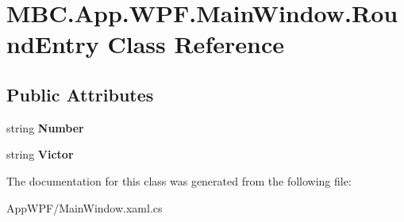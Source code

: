 \hypertarget{class_m_b_c_1_1_app_1_1_w_p_f_1_1_main_window_1_1_round_entry}{\section{M\-B\-C.\-App.\-W\-P\-F.\-Main\-Window.\-Round\-Entry Class Reference}
\label{class_m_b_c_1_1_app_1_1_w_p_f_1_1_main_window_1_1_round_entry}
}
\subsection*{Public Attributes}
\begin{DoxyCompactItemize}
\item 
\hypertarget{class_m_b_c_1_1_app_1_1_w_p_f_1_1_main_window_1_1_round_entry_ad8236652c4530474ffe31c695f546b92}{string {\bfseries Number}}\label{class_m_b_c_1_1_app_1_1_w_p_f_1_1_main_window_1_1_round_entry_ad8236652c4530474ffe31c695f546b92}

\item 
\hypertarget{class_m_b_c_1_1_app_1_1_w_p_f_1_1_main_window_1_1_round_entry_a0ec0ce9ff0d03cfcd8f3a99a5d0ed15e}{string {\bfseries Victor}}\label{class_m_b_c_1_1_app_1_1_w_p_f_1_1_main_window_1_1_round_entry_a0ec0ce9ff0d03cfcd8f3a99a5d0ed15e}

\end{DoxyCompactItemize}


The documentation for this class was generated from the following file\-:\begin{DoxyCompactItemize}
\item 
App\-W\-P\-F/Main\-Window.\-xaml.\-cs\end{DoxyCompactItemize}
